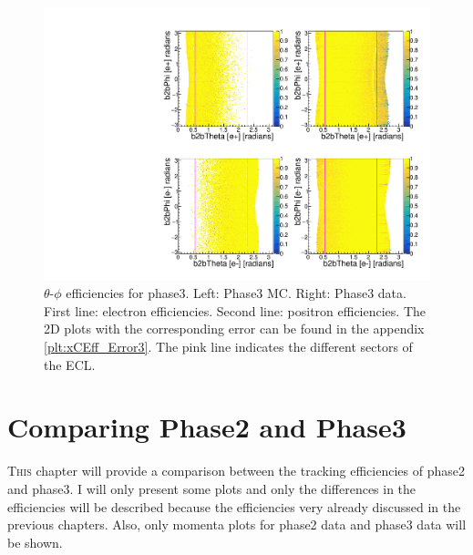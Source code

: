 \documentclass[a4paper,11pt,twosided,final,german,openbib,pdftex,listof=totoc,bibliography=totoc]{scrbook}
\begin{document}
\begin{figure}[!htbp]
	\centering
	\includegraphics[width=\textwidth]{Plots/master3/xCEffTP_MCDataP3.pdf}
	\caption[$\theta$-$\phi$ Efficiency Plots Phase3]{$\theta$-$\phi$ efficiencies for phase3. Left: Phase3 MC. Right: Phase3 data. First line: electron efficiencies. Second line: positron efficiencies. The 2D plots with the corresponding error can be found in the appendix \ref{plt:xCEff_Error3}. The pink line indicates the different sectors of the ECL.}
	\label{plt:xCEff3}
\end{figure}

\chapter{Comparing Phase2 and Phase3}
\lettrine{T}{his} chapter will provide a comparison between the tracking efficiencies of phase2 and phase3. I will only present some plots and only the differences in the efficiencies will be described because the efficiencies very already discussed in the previous chapters. Also, only momenta plots for phase2 data and phase3 data will be shown.
\end{document}
